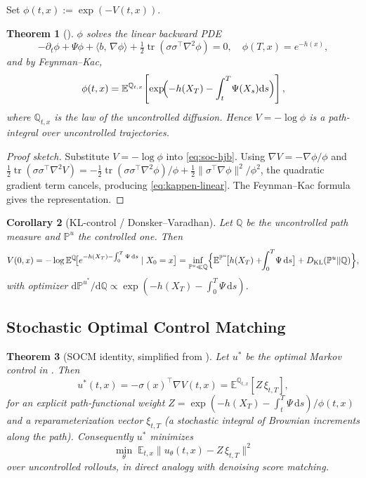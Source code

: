 \documentclass[11pt,letterpaper]{article}
\theoremstyle{plain}
\newtheorem{theorem}{Theorem}[section]
\newtheorem{corollary}[theorem]{Corollary}
\theoremstyle{definition}
\theoremstyle{remark}
\newcommand{\E}{\mathbb{E}}
\newcommand{\dd}{\mathrm{d}}
\newcommand{\KL}{D_{\mathrm{KL}}}
\newcommand{\tr}{\operatorname{tr}}
\newcommand{\grad}{\nabla}
\newcommand{\inner}[2]{\langle #1,\,#2\rangle}
\newcommand{\norm}[1]{\lVert #1\rVert}
\begin{document}
Set $\phi(t,x):=\exp(-V(t,x))$.

\begin{theorem}[\citealt{kappen2005path}]\label{thm:kappen}
$\phi$ solves the \emph{linear} backward PDE
\begin{equation}
  -\partial_t\phi+\Psi\phi+\inner{b}{\grad\phi}
   +\tfrac12\tr(\sigma\sigma^\top\nabla^2\phi)=0,\quad\phi(T,x)=e^{-h(x)},
  \label{eq:kappen-linear}
\end{equation}
and by Feynman--Kac,
\begin{equation}
  \phi(t,x)=\E^{\mathbb{Q}_{t,x}}\!\left[\exp\!\Bigl(-h(X_T)-\int_t^T\!\Psi(X_s)\dd s\Bigr)\right],
  \label{eq:feynman-kac-app}
\end{equation}
where $\mathbb{Q}_{t,x}$ is the law of the \emph{uncontrolled} diffusion.
Hence $V=-\log\phi$ is a path-integral over uncontrolled trajectories.
\end{theorem}
\begin{proof}[Proof sketch]
Substitute $V=-\log\phi$ into \eqref{eq:soc-hjb}. Using
$\grad V=-\grad\phi/\phi$ and
$\tfrac12\tr(\sigma\sigma^\top\nabla^2 V)
=-\tfrac12\tr(\sigma\sigma^\top\nabla^2\phi)/\phi+\tfrac12\norm{\sigma^\top\grad\phi}^2/\phi^2$,
the quadratic gradient term cancels, producing \eqref{eq:kappen-linear}. The
Feynman--Kac formula gives the representation.
\end{proof}

\begin{corollary}[KL-control / Donsker--Varadhan]\label{cor:klcontrol}
Let $\mathbb{Q}$ be the uncontrolled path measure and
$\mathbb{P}^u$ the controlled one. Then
\[
  V(0,x)=-\log\E^{\mathbb{Q}}\!\bigl[e^{-h(X_T)-\int_0^T\Psi\,\dd s}\mid X_0=x\bigr]
  =\inf_{\mathbb{P}^u\ll\mathbb{Q}}\Bigl\{\E^{\mathbb{P}^u}\!\bigl[h(X_T)+\!\!\int_0^T\!\Psi\,\dd s\bigr]+\KL(\mathbb{P}^u\|\mathbb{Q})\Bigr\},
\]
with optimizer
$\dd\mathbb{P}^{u^*}/\dd\mathbb{Q}\propto\exp(-h(X_T)-\int_0^T\Psi\,\dd s)$.
\end{corollary}

\subsection{Stochastic Optimal Control Matching}

\begin{theorem}[SOCM identity, simplified from {\citep[Prop.~3.1]{domingoenrich2024socm}}]\label{thm:socm}
Let $u^*$ be the optimal Markov control in . Then
\begin{equation}
  u^*(t,x)=-\sigma(x)^\top\grad V(t,x)=\E^{\mathbb{Q}_{t,x}}[Z\,\xi_{t,T}],
\end{equation}
for an explicit path-functional weight $Z=\exp(-h(X_T)-\int_t^T\Psi\,\dd s)/\phi(t,x)$
and a reparameterization vector $\xi_{t,T}$ (a stochastic integral of
Brownian increments along the path). Consequently $u^*$ minimizes
\[
  \min_\theta\;\E_{t,x}\bigl\lVert u_\theta(t,x)-Z\,\xi_{t,T}\bigr\rVert^2
\]
over uncontrolled rollouts, in direct analogy with denoising score matching.
\end{theorem}
\end{document}
